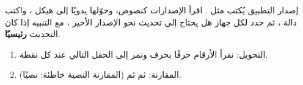 \begin{statement}
إصدار التطبيق يُكتب  مثل . اقرأ الإصدارات كنصوص، وحوّلها يدويًا إلى هيكل ، واكتب دالة ، ثم حدد لكل جهاز هل يحتاج إلى تحديث نحو الإصدار الأخير ، مع التنبيه إذا كان التحديث \textbf{رئيسيًا}.
\end{statement}
\begin{stepsbox}\begin{enumerate}
\item التحويل: نقرأ الأرقام حرفًا بحرف ونمر إلى الحقل التالي عند كل نقطة.
\item المقارنة:  ثم  ثم  (المقارنة النصية خاطئة:  نصيًا).
\end{enumerate}\end{stepsbox}
